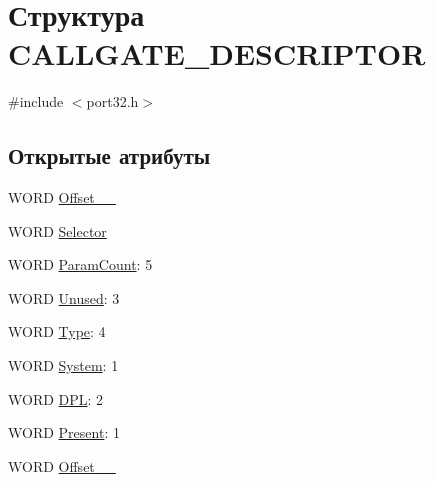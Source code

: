 \hypertarget{struct_c_a_l_l_g_a_t_e___d_e_s_c_r_i_p_t_o_r}{\section{Структура C\-A\-L\-L\-G\-A\-T\-E\-\_\-\-D\-E\-S\-C\-R\-I\-P\-T\-O\-R}
\label{struct_c_a_l_l_g_a_t_e___d_e_s_c_r_i_p_t_o_r}
}


{\ttfamily \#include $<$port32.\-h$>$}

\subsection*{Открытые атрибуты}
\begin{DoxyCompactItemize}
\item 
W\-O\-R\-D \hyperlink{struct_c_a_l_l_g_a_t_e___d_e_s_c_r_i_p_t_o_r_a6f449fd6bf5a325a557c9ae4a5d90e26}{Offset\-\_\-\_}
\item 
W\-O\-R\-D \hyperlink{struct_c_a_l_l_g_a_t_e___d_e_s_c_r_i_p_t_o_r_ac7fd2d8e621350a3605d9eb96d156aca}{Selector}
\item 
W\-O\-R\-D \hyperlink{struct_c_a_l_l_g_a_t_e___d_e_s_c_r_i_p_t_o_r_a4c2fe3a00dbf9b9a501f12a870ff23c9}{Param\-Count}\-: 5
\item 
W\-O\-R\-D \hyperlink{struct_c_a_l_l_g_a_t_e___d_e_s_c_r_i_p_t_o_r_a438daced95d18f4cd40400fe329e9703}{Unused}\-: 3
\item 
W\-O\-R\-D \hyperlink{struct_c_a_l_l_g_a_t_e___d_e_s_c_r_i_p_t_o_r_afe8eeb6feb35759b5451fbaaff9b0492}{Type}\-: 4
\item 
W\-O\-R\-D \hyperlink{struct_c_a_l_l_g_a_t_e___d_e_s_c_r_i_p_t_o_r_a23159ce2d47f9d33d18e34382486a40a}{System}\-: 1
\item 
W\-O\-R\-D \hyperlink{struct_c_a_l_l_g_a_t_e___d_e_s_c_r_i_p_t_o_r_ab894af7ba4b99ca53fea9faf444b9616}{D\-P\-L}\-: 2
\item 
W\-O\-R\-D \hyperlink{struct_c_a_l_l_g_a_t_e___d_e_s_c_r_i_p_t_o_r_ad344e4cf67a98c0a408b4759bdec2b79}{Present}\-: 1
\item 
W\-O\-R\-D \hyperlink{struct_c_a_l_l_g_a_t_e___d_e_s_c_r_i_p_t_o_r_aea73ed7bc4012291b93523026753c346}{Offset\-\_\-\_}
\end{DoxyCompactItemize}


